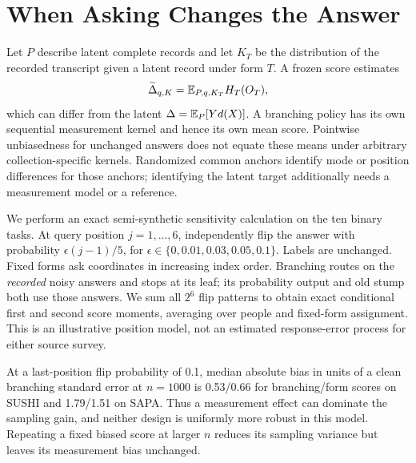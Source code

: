 \section{When Asking Changes the Answer}\label{app:measurement}
Let $P$ describe latent complete records and let $K_T$ be the distribution
of the recorded transcript given a latent record under form $T$. A frozen
score estimates
\[
 \widetilde\Delta_{q,K}
   =\mathbb{E}_{P,q,K_T}H_T(O_T),
\]
which can differ from the latent $\Delta=\mathbb{E}_P[Yd(X)]$. A branching policy
has its own sequential measurement kernel and hence its own mean score.
Pointwise unbiasedness for unchanged answers does not equate these means
under arbitrary collection-specific kernels. Randomized common anchors
identify mode or position differences for those anchors; identifying the
latent target additionally needs a measurement model or a reference.

We perform an exact semi-synthetic sensitivity calculation on the ten
binary tasks. At query position $j=1,\ldots,6$, independently flip the
answer with probability $\epsilon(j-1)/5$, for
$\epsilon\in\{0,0.01,0.03,0.05,0.1\}$. Labels are unchanged. Fixed forms
ask coordinates in increasing index order. Branching routes on the
\emph{recorded} noisy answers and stops at its leaf; its probability output
and old stump both use those answers. We sum all $2^6$ flip patterns to
obtain exact conditional first and second score moments, averaging over
people and fixed-form assignment. This is an illustrative position model,
not an estimated response-error process for either source survey.



At a last-position flip probability of 0.1, median absolute bias in units
of a clean branching standard error at $n=1000$ is 0.53/0.66 for
branching/form scores on SUSHI and 1.79/1.51 on SAPA. Thus a measurement
effect can dominate the sampling gain, and neither design is uniformly
more robust in this model. Repeating a fixed biased score at larger $n$
reduces its sampling variance but leaves its measurement bias unchanged.

